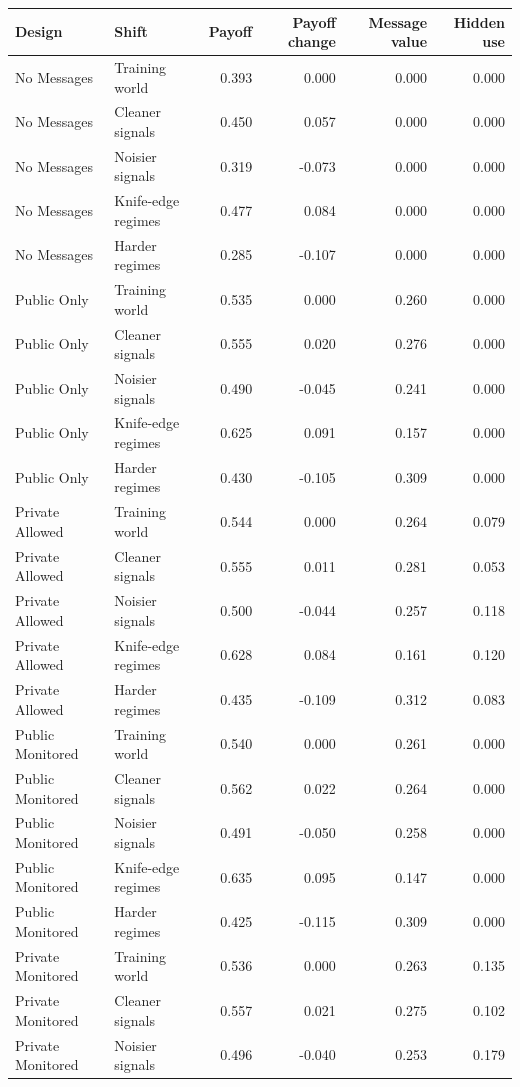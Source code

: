\begin{tabular}{llrrrr}
\toprule
Design & Shift & Payoff & Payoff change & Message value & Hidden use \\
\midrule
No Messages & Training world & 0.393 & 0.000 & 0.000 & 0.000 \\
No Messages & Cleaner signals & 0.450 & 0.057 & 0.000 & 0.000 \\
No Messages & Noisier signals & 0.319 & -0.073 & 0.000 & 0.000 \\
No Messages & Knife-edge regimes & 0.477 & 0.084 & 0.000 & 0.000 \\
No Messages & Harder regimes & 0.285 & -0.107 & 0.000 & 0.000 \\
Public Only & Training world & 0.535 & 0.000 & 0.260 & 0.000 \\
Public Only & Cleaner signals & 0.555 & 0.020 & 0.276 & 0.000 \\
Public Only & Noisier signals & 0.490 & -0.045 & 0.241 & 0.000 \\
Public Only & Knife-edge regimes & 0.625 & 0.091 & 0.157 & 0.000 \\
Public Only & Harder regimes & 0.430 & -0.105 & 0.309 & 0.000 \\
Private Allowed & Training world & 0.544 & 0.000 & 0.264 & 0.079 \\
Private Allowed & Cleaner signals & 0.555 & 0.011 & 0.281 & 0.053 \\
Private Allowed & Noisier signals & 0.500 & -0.044 & 0.257 & 0.118 \\
Private Allowed & Knife-edge regimes & 0.628 & 0.084 & 0.161 & 0.120 \\
Private Allowed & Harder regimes & 0.435 & -0.109 & 0.312 & 0.083 \\
Public Monitored & Training world & 0.540 & 0.000 & 0.261 & 0.000 \\
Public Monitored & Cleaner signals & 0.562 & 0.022 & 0.264 & 0.000 \\
Public Monitored & Noisier signals & 0.491 & -0.050 & 0.258 & 0.000 \\
Public Monitored & Knife-edge regimes & 0.635 & 0.095 & 0.147 & 0.000 \\
Public Monitored & Harder regimes & 0.425 & -0.115 & 0.309 & 0.000 \\
Private Monitored & Training world & 0.536 & 0.000 & 0.263 & 0.135 \\
Private Monitored & Cleaner signals & 0.557 & 0.021 & 0.275 & 0.102 \\
Private Monitored & Noisier signals & 0.496 & -0.040 & 0.253 & 0.179 \\

\end{tabular}
